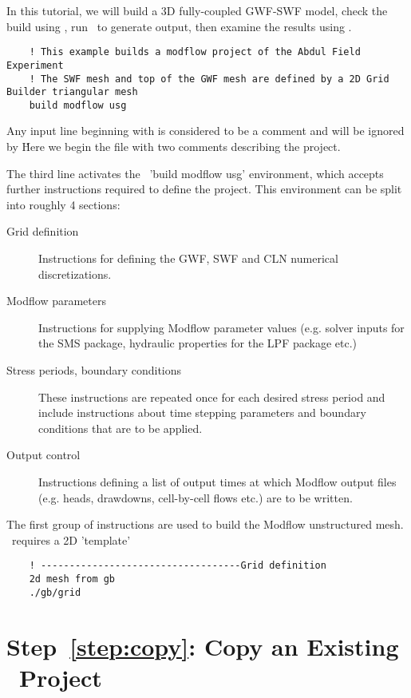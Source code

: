 \label{tutorial:MutUseage} In this tutorial, we will build a 3D fully-coupled GWF-SWF model, check the build using \tecplot, run \mfus\ to generate output, then examine the results using \tecplot.

\begin{verbatim}
    ! This example builds a modflow project of the Abdul Field Experiment
    ! The SWF mesh and top of the GWF mesh are defined by a 2D Grid Builder triangular mesh
    build modflow usg
\end{verbatim}

Any input line beginning with  is considered to be a comment and will be ignored by \mut\.  Here we begin the file with two comments describing the project.

The third line activates the \mut\ 'build modflow usg' environment, which accepts further instructions required to define the project. This environment can be split into roughly 4 sections:
\begin{description}
    \item[Grid definition] Instructions for defining the GWF, SWF and CLN numerical discretizations.
    \item[Modflow parameters] Instructions for supplying Modflow parameter values (e.g. solver inputs for the SMS package, hydraulic properties for the LPF package etc.)
    \item[Stress periods, boundary conditions] These instructions are repeated once for each desired stress period and include instructions about time stepping parameters and boundary conditions that are to be applied.
    \item[Output control] Instructions defining a list of output times at which Modflow output files (e.g. heads, drawdowns, cell-by-cell flows etc.) are to be written.
\end{description}


The first group of instructions are used to build the Modflow unstructured mesh. \mut\ requires a 2D 'template'

\begin{verbatim}
    ! -----------------------------------Grid definition
    2d mesh from gb
    ./gb/grid
\end{verbatim}

\section*{Step~\ref{step:copy}: Copy an Existing \mut\ Project}

